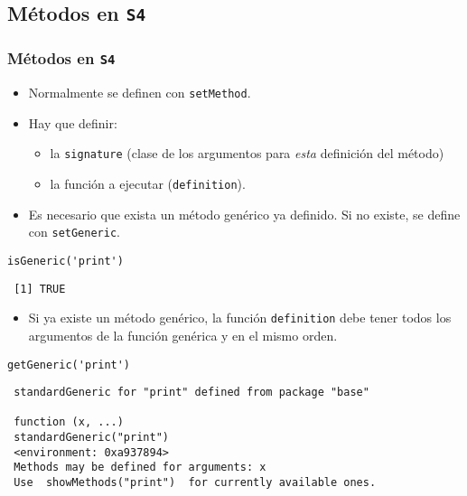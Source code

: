 \documentclass[xcolor={usenames,svgnames,dvipsnames}]{beamer}
\begin{document}
\subsection{Métodos en \texttt{S4}}
\label{sec-3-2}
\begin{frame}[fragile]
\frametitle{Métodos en \texttt{S4}}
\label{sec-3-2-1}

\begin{itemize}
\item Normalmente se definen con \texttt{setMethod}.
\item Hay que definir:
\begin{itemize}
\item la \texttt{signature} (clase de los argumentos para \emph{esta} definición del
    método)
\item la función a ejecutar (\texttt{definition}).
\end{itemize}
\item Es necesario que exista un método genérico ya definido. Si no
  existe, se define con \texttt{setGeneric}.
\end{itemize}

\lstset{language=R}
\begin{lstlisting}
isGeneric('print')
\end{lstlisting}

\begin{verbatim}
 [1] TRUE
\end{verbatim}

\begin{itemize}
\item Si ya existe un método genérico, la función \texttt{definition} debe tener
  todos los argumentos de la función genérica y en el mismo orden.
\end{itemize}

\lstset{language=R}
\begin{lstlisting}
getGeneric('print')
\end{lstlisting}

\begin{verbatim}
 standardGeneric for "print" defined from package "base"
 
 function (x, ...) 
 standardGeneric("print")
 <environment: 0xa937894>
 Methods may be defined for arguments: x
 Use  showMethods("print")  for currently available ones.
\end{verbatim}
\end{frame}
\end{document}
